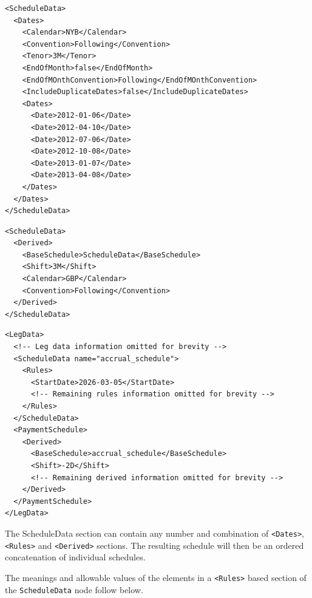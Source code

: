 \begin{listing}[H]
\begin{verbatim}
<ScheduleData>
  <Dates>
    <Calendar>NYB</Calendar>
    <Convention>Following</Convention>
    <Tenor>3M</Tenor>
    <EndOfMonth>false</EndOfMonth>
    <EndOfMOnthConvention>Following</EndOfMOnthConvention>
    <IncludeDuplicateDates>false</IncludeDuplicateDates>
    <Dates>
      <Date>2012-01-06</Date>
      <Date>2012-04-10</Date>
      <Date>2012-07-06</Date>
      <Date>2012-10-08</Date>
      <Date>2013-01-07</Date>
      <Date>2013-04-08</Date>
    </Dates>
  </Dates>
</ScheduleData>
\end{verbatim}
\caption{Schedule data, date based}
\label{lst:schedule_data_false}
\end{listing}

\begin{listing}[H]
\begin{verbatim}
<ScheduleData>
  <Derived>
    <BaseSchedule>ScheduleData</BaseSchedule>
    <Shift>3M</Shift>
    <Calendar>GBP</Calendar>
    <Convention>Following</Convention>
  </Derived>
</ScheduleData>
\end{verbatim}
\caption{Schedule data, derived}
\label{lst:schedule_data_derived}
\end{listing}

\begin{listing}[H]
\begin{verbatim}
<LegData>
  <!-- Leg data information omitted for brevity -->
  <ScheduleData name="accrual_schedule">
    <Rules>
      <StartDate>2026-03-05</StartDate>
      <!-- Remaining rules information omitted for brevity -->
    </Rules>
  </ScheduleData>
  <PaymentSchedule>
    <Derived>
      <BaseSchedule>accrual_schedule</BaseSchedule>
      <Shift>-2D</Shift>
      <!-- Remaining derived information omitted for brevity -->
    </Derived>
  </PaymentSchedule>
</LegData>
\end{verbatim}
\caption{Derived payment schedule in \lstinline!LegData!.}
\label{lst:derived_pmt_schedule}
\end{listing}

The ScheduleData section can contain any number and combination of
{\tt <Dates>}, {\tt <Rules>} and {\tt <Derived>} sections. The resulting schedule will
then be an ordered concatenation of individual schedules.
 
\medskip
The meanings and allowable values of the elements in a {\tt <Rules>} based section of the \lstinline!ScheduleData! node follow below.


